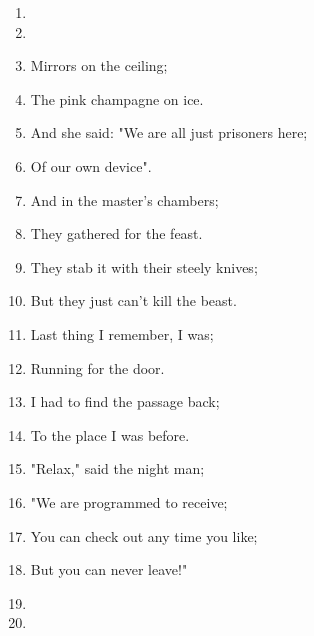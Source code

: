 \documentclass{article}
\begin{document}
\begin{center}
\begin{enumerate}
            \item[]
            \item[] 
            \item Mirrors on the ceiling;
            \item The pink champagne on ice.
            \item And she said: "We are all just prisoners here;
            \item Of our own device".
            \item And in the master's chambers;
            \item They gathered for the feast.
            \item They stab it with their steely knives;
            \item But they just can't kill the beast.
            \item Last thing I remember, I was;
            \item Running for the door.
            \item I had to find the passage back;
            \item To the place I was before.
            \item "Relax," said the night man;
            \item "We are programmed to receive;
            \item You can check out any time you like;
            \item But you can never leave!"

            \item[]
            \item[] \instrumental

        \end{enumerate}
    \end{center}
\end{document}
